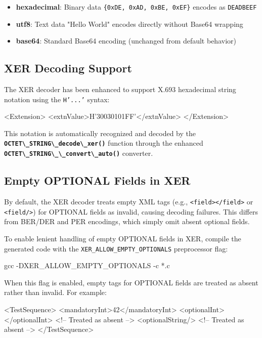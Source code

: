 \documentclass[english,oneside,12pt]{book}
\newcommand{\code}[1]{\texttt{\textbf{\lstinline{#1}}}}
\begin{document}
\begin{itemize}
\item \textbf{hexadecimal}: Binary data \texttt{\{0xDE, 0xAD, 0xBE, 0xEF\}} encodes as \texttt{DEADBEEF}
\item \textbf{utf8}: Text data "Hello World" encodes directly without Base64 wrapping
\item \textbf{base64}: Standard Base64 encoding (unchanged from default behavior)
\end{itemize}

\subsection*{XER Decoding Support}

The XER decoder has been enhanced to support X.693 hexadecimal string notation using 
the \texttt{H'...'} syntax:

\begin{example}
<Extension>
    <extnValue>H'30030101FF'</extnValue>
</Extension>
\end{example}

This notation is automatically recognized and decoded by the \code{OCTET\_STRING\_decode\_xer()} 
function through the enhanced \code{OCTET\_STRING\_\_convert\_auto()} converter.

\subsection*{Empty OPTIONAL Fields in XER}

By default, the XER decoder treats empty XML tags (e.g., \texttt{<field></field>} or 
\texttt{<field/>}) for OPTIONAL fields as invalid, causing decoding failures. This differs 
from BER/DER and PER encodings, which simply omit absent optional fields.

To enable lenient handling of empty OPTIONAL fields in XER, compile the generated code 
with the \texttt{XER\_ALLOW\_EMPTY\_OPTIONALS} preprocessor flag:

\begin{bash}
gcc -DXER_ALLOW_EMPTY_OPTIONALS -c *.c
\end{bash}

When this flag is enabled, empty tags for OPTIONAL fields are treated as absent rather 
than invalid. For example:

\begin{example}
<TestSequence>
    <mandatoryInt>42</mandatoryInt>
    <optionalInt></optionalInt>    <!-- Treated as absent -->
    <optionalString/>              <!-- Treated as absent -->
</TestSequence>
\end{example}
\end{document}
